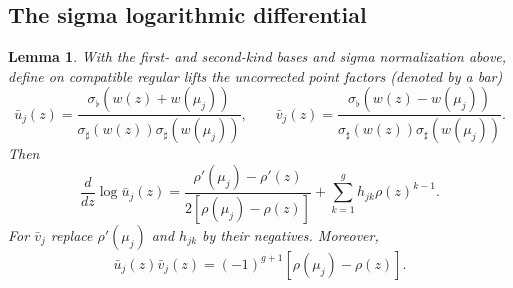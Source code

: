 \documentclass[11pt]{article}
\newtheorem{lemma}[theorem]{Lemma}
\begin{document}
\subsection{The sigma logarithmic differential}

\begin{lemma}\label{lem:kernel}
With the first- and second-kind bases and sigma normalization above, define on compatible regular lifts the uncorrected point factors (denoted by a bar)
\[
\bar u_j(z)=\frac{\sigma_\flat(w(z)+w(\mu_j))}
{\sigma_\sharp(w(z))\sigma_\sharp(w(\mu_j))},\qquad
\bar v_j(z)=\frac{\sigma_\flat(w(z)-w(\mu_j))}
{\sigma_\sharp(w(z))\sigma_\sharp(w(\mu_j))}.
\]
Then
\begin{equation}\label{eq:kernel-log}
\frac{d}{dz}\log\bar u_j(z)
=\frac{\rho'(\mu_j)-\rho'(z)}{2[\rho(\mu_j)-\rho(z)]}
+\sum_{k=1}^g h_{jk}\rho(z)^{k-1}.
\end{equation}
For $\bar v_j$ replace $\rho'(\mu_j)$ and $h_{jk}$ by their negatives. Moreover,
\begin{equation}\label{eq:kernel-product}
\bar u_j(z)\bar v_j(z)=(-1)^{g+1}[\rho(\mu_j)-\rho(z)].
\end{equation}
\end{lemma}
\end{document}
